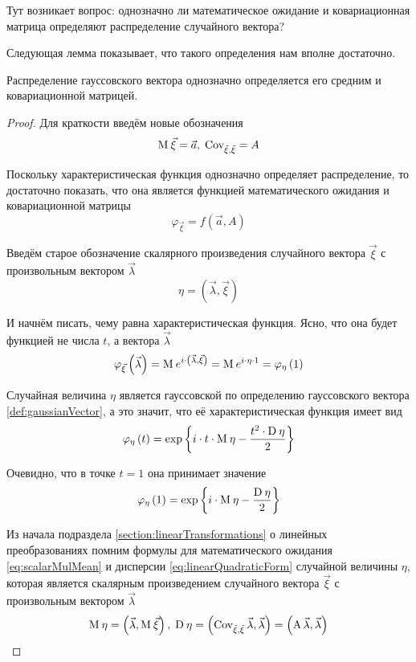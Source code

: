 Тут возникает вопрос: однозначно ли математическое ожидание
и ковариационная матрица определяют распределение случайного вектора?

Следующая лемма показывает, что такого определения нам вполне достаточно.

\begin{lemma}\label{lemma:gaussianVector:characteristicFunction}
    Распределение гауссовского вектора однозначно определяется его средним и
    ковариационной матрицей.
\end{lemma}
\begin{proof}
    Для краткости введём новые обозначения
    $$\operatorname{M}_{} \vec{\xi} = \vec{a},\; \operatorname{Cov^{}_{\vec{\xi}, \vec{\xi}}} = A$$

    Поскольку характеристическая функция однозначно определяет распределение,
    то достаточно показать, что она является функцией математического ожидания
    и ковариационной матрицы
    $$\varphi_{\vec{\xi}} = f\left( \vec{a}, A \right)$$

    Введём старое обозначение скалярного произведения случайного вектора
    $\vec{\xi}$ с произвольным вектором $\vec{\lambda}$
    $$\eta = \left( \vec{\lambda}, \vec{\xi} \right)$$

    И начнём писать, чему равна характеристическая функция. Ясно, что она будет
    функцией не числа $t$, а вектора $\vec{\lambda}$
    $$\varphi_{\vec{\xi}}\left( \vec{\lambda} \right)
        = \operatorname{M}_{} e^{i \cdot \left( \vec{\lambda}, \vec{\xi} \right)}
        = \operatorname{M}_{} e^{i \cdot \eta \cdot 1}
        = \varphi_{\eta}\left( 1 \right)$$

    Случайная величина $\eta$ является гауссовской по определению гауссовского
    вектора \ref{def:gaussianVector}, а это значит, что её характеристическая
    функция имеет вид
    $$\varphi_{\eta}\left( t \right)
        = \exp{\left\{ i \cdot t \cdot \operatorname{M}_{} \eta
            - \frac{t^2 \cdot \operatorname{D}_{} \eta}{2} \right\}}$$

    Очевидно, что в точке $t=1$ она принимает значение
    $$\varphi_{\eta}\left( 1 \right)
        = \exp{\left\{ i \cdot \operatorname{M}_{} \eta
            - \frac{\operatorname{D}_{} \eta}{2} \right\}}$$

    Из начала подраздела \ref{section:linearTransformations} о линейных
    преобразованиях помним формулы для математического ожидания
    \eqref{eq:scalarMulMean} и дисперсии \eqref{eq:linearQuadraticForm}
    случайной величины $\eta$, которая является скалярным произведением
    случайного вектора $\vec{\xi}$ с произвольным вектором $\vec{\lambda}$
    $$\operatorname{M}_{} \eta = \left( \vec{\lambda}, \operatorname{M}_{} \vec{\xi} \right),\;
        \operatorname{D}_{} \eta
            = \left( \operatorname{\operatorname{Cov^{}_{\vec{\xi}, \vec{\xi}}}} \vec{\lambda} ,
                \vec{\lambda} \right)
            = \left( \operatorname{A} \vec{\lambda} ,
                \vec{\lambda} \right)$$


\end{proof}
